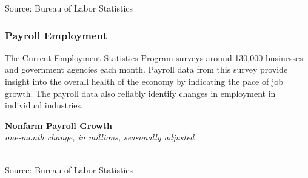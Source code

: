 \documentclass{report}
\makeatletter
\newcommand{\tbllink}[1]{\href{https://raw.githubusercontent.com/bdecon/US-chartbook/master/chartbook/data/#1}{\faTable}}
\newcommand*\short[1]{\expandafter\@gobbletwo\number\numexpr#1\relax}
\newcommand{\ctsbar}[5]{
		\addplot[ybar stacked, bar width=#5, draw opacity=0, fill=#1] 
			table [x=#2, y=#3, col sep=comma]{#4};}
\newcommand{\absnode}[3]{\node[below right, align=left] at (axis cs: #1,#2) {#3};}
\newcommand{\ltdateaxisticks}{
		date coordinates in=x, axis line style={draw=none},
		xmax={2023-02-15},
		max space between ticks=40,	    
		xtick={{2013-01-01}, {2014-01-01}, {2015-01-01}, {2016-01-01}, {2017-01-01}, {2018-01-01}, 
		    {2019-01-01}, {2020-01-01}, {2021-01-01}, {2022-01-01}, {2023-01-01}},
		enlarge y limits={0.06}, enlarge x limits={0.01},
		}
\newcommand{\bbar}[2]{extra #1 ticks = {{#2}}, extra #1 tick labels = ,
		extra #1 tick style = {grid=major, grid style={thick, black!25}},}
\newcommand{\rbar}{
		\fill[color=black!10] (axis cs:{2020-02-01},\pgfkeysvalueof{/pgfplots/ymin}) rectangle 
			(axis cs:{2020-05-01}, \pgfkeysvalueof{/pgfplots/ymax});}
\makeatother
\begin{document}
{\begin{minipage}{0.76\textwidth}
\vspace{-1mm}	
\footnotesize{Source: Bureau of Labor Statistics}
\end{minipage}
\newpage
\begin{minipage}{0.76\textwidth}
\subsubsection*{Payroll Employment}
\small The Current Employment Statistics Program \href{https://www.bls.gov/ces/}{surveys} around 130,000 businesses and government agencies each month. Payroll data from this survey provide insight into the overall health of the economy by indicating the pace of job growth. The payroll data also reliably identify changes in employment in individual industries. 
\vspace{1mm}

\begin{minipage}{0.41\textwidth}
\small 
\end{minipage} \hfill
\begin{minipage}{0.52\textwidth}
\normalsize \textbf{Nonfarm Payroll Growth}\\
\footnotesize{\textit{one-month change, in millions, seasonally adjusted}}\\
\hspace*{-2mm} \\
\footnotesize{Source: Bureau of Labor Statistics} \hfill \tbllink{nfp.csv}
\end{minipage}
\vspace{3mm}


\end{minipage}}
\end{document}
